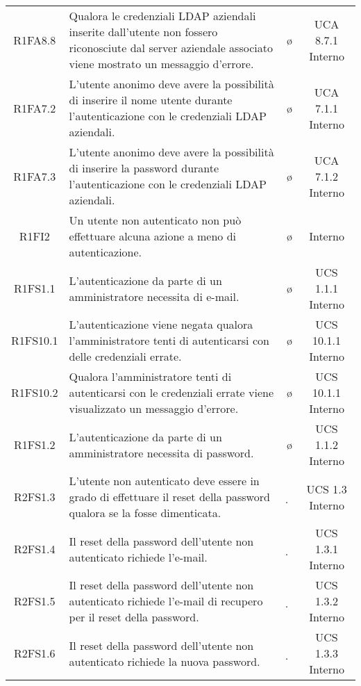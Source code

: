 {\begin{longtable}{ c C{6.5cm} c c}
R1FA8.8 & Qualora le credenziali LDAP aziendali inserite dall'utente non fossero riconosciute dal server aziendale associato viene mostrato un messaggio d'errore. & \o & UCA 8.7.1 Interno \\

R1FA7.2 & L'utente anonimo deve avere la possibilità di inserire il nome utente durante l'autenticazione con le credenziali LDAP aziendali. & \o & UCA 7.1.1 Interno \\

R1FA7.3 & L'utente anonimo deve avere la possibilità di inserire la password durante l'autenticazione con le credenziali LDAP aziendali. & \o & UCA 7.1.2 Interno \\

R1FI2 & Un utente non autenticato non può effettuare alcuna azione a meno di autenticazione. & \o & Interno \\

R1FS1.1 & L’autenticazione da parte di un amministratore necessita di e-mail. & \o & UCS 1.1.1 Interno\\

R1FS10.1 & L’autenticazione viene negata qualora l'amministratore tenti di autenticarsi con delle credenziali errate. & \o & UCS 10.1.1 Interno \\

R1FS10.2 & Qualora l'amministratore tenti di autenticarsi con le credenziali errate viene visualizzato un messaggio d’errore. & \o & UCS 10.1.1 Interno \\

R1FS1.2 & L’autenticazione da parte di un amministratore necessita di password. & \o & UCS 1.1.2 Interno\\

R2FS1.3 & L'utente non autenticato deve essere in grado di effettuare il reset della password qualora se la fosse dimenticata. & \d & UCS 1.3 Interno\\

R2FS1.4 & Il reset della password dell'utente non autenticato richiede l'e-mail. & \d & UCS 1.3.1 Interno \\

R2FS1.5 & Il reset della password dell'utente non autenticato richiede l'e-mail di recupero per il reset della password. & \d & UCS 1.3.2 Interno \\

R2FS1.6 & Il reset della password dell'utente non autenticato richiede la nuova password. & \d & UCS 1.3.3 Interno \\


\end{longtable}}
